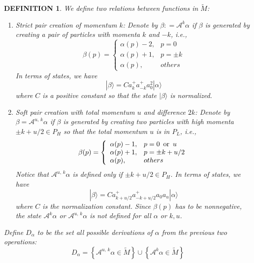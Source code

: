 \documentclass[11pt]{article}
\numberwithin{equation}{section}
\newcommand{\ann}{a^{\hphantom{+}}}
\newcommand{\cre}{a^{\dagger}}
\newcommand{\beq}{\begin{equation}}
\newcommand{\eeq}{\end{equation}}
\newcommand\const{{\rm const.\, }}
\newcommand\al{{\alpha}}
\newcommand\be{\beta}
\newtheorem{mydef}{DEFINITION}[section]
\theoremstyle{definition}
\begin{document}

%


\begin{mydef}
We define two  relations between functions in $\widetilde M$: 
\begin{enumerate}
	\item Strict pair creation of momentum $k$: Denote by  $
\be: =  \mathcal A^k \al $
 if $\beta$ is generated by creating 
a pair of particles with momenta $k$ and $-k$, i.e., 
\beq	
\be(p)= \left\{ 
\begin{array}{ll}
\al(p)-2,& p=0 \\ 
\al(p)+1, & p=\pm k\\
\al(p), & others
\end{array}\right.
\eeq
In terms of states, we have 
\[
|\be\rangle =  C a^+_k a^+_{-k} a_0^2 | \alpha\rangle 
\]
where $C$ is a positive constant so that the state $|\be\rangle$ is normalized. 


\item Soft pair creation with total momentum $u$ and difference $ 2 k$:   
Denote by  $\beta=\mathcal A^{u,\,k}\al$ if $\beta$ is generated by creating two  particles with high momenta $\pm k+u/2\in P_H$ 
so that the total momentum $u$ is in $P_L$, i.e., 
\beq	
\be(p)= \left\{ 
\begin{array}{ll}
\al(p)-1,& p=0\,\,\, {\rm or}\,\,\, u \\ 
\al(p)+1, & p=\pm k+u/2\\
\al(p), & others
\end{array}\right.
\eeq
Notice that $\mathcal A^{u,\,k}\al$ is defined only if $\pm k+u/2\in P_H$. 
In terms of states, we have 
\[
|\be\rangle = C a^+_{k+ u/2} a^+_{-k + u/2} a_0 a_u | \alpha\rangle 
\]
where $C$ is the normalization constant. 
Since $\beta(p)$ 
has to be  nonnegative,  the state  $\mathcal A^{k}\al$ or  $\mathcal A^{u,\,k}\al$ is not defined for all $\alpha$ or $k, u$. 
\end{enumerate}
Define $D_\alpha$ to be  the set all possible derivations of $\alpha$ from the previous two operations: 
\beq
D_\alpha=\left\{\mathcal A^{u,\,k}\al \in \widetilde M \right\}\cup\left\{\mathcal A^{k}\al \in \widetilde M\right\}
\eeq
\end{mydef}
\end{document}
